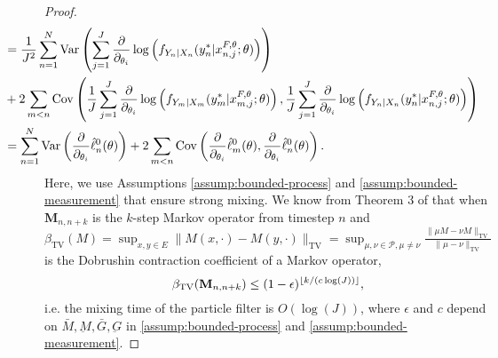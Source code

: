 \begin{proof}
\begin{align}
    & \hspace{-15mm}= \frac{1}{J^2}\sum_{n=1}^N\Var\left(\sum_{j=1}^{J}\frac{\partial}{\partial_{\theta_i}} \log\left(f_{Y_n|X_{n}}(y_n^*|x_{n,j}^{F, \theta}; \theta)\right)\right) \\
    &\hspace{-15mm}+ 2\sum_{m<n}\Cov\left(\frac{1}{J}\sum_{j=1}^{J}\frac{\partial}{\partial_{\theta_i}} \log\left(f_{Y_m|X_{m}}(y_m^*|x_{m,j}^{F, \theta}; \theta)\right), \frac{1}{J}\sum_{j=1}^{J}\frac{\partial}{\partial_{\theta_i}} \log\left(f_{Y_n|X_{n}}(y_n^*|x_{n,j}^{F, \theta}; \theta)\right)\right) \\
    &\hspace{-15mm}= \sum_{n=1}^N \Var\left(\frac{\partial}{\partial_{\theta_i}}\hat\ell_n^0(\theta)\right) + 2\sum_{m<n} \Cov\left(\frac{\partial}{\partial_{\theta_i}}\hat\ell_m^0(\theta),\frac{\partial}{\partial_{\theta_i}}\hat\ell_n^0(\theta)\right).
\end{align}
Here, we use Assumptions \ref{assump:bounded-process} and \ref{assump:bounded-measurement} that ensure strong mixing. We know from Theorem 3 of \cite{karjalainen23} that when $\textbf{M}_{n,n+k}$ is the $k$-step Markov operator from timestep $n$ and $\beta_{\text{TV}}(M) = \sup _{x, y \in E}\|M(x, \cdot)-M(y, \cdot)\|_{\mathrm{TV}}=\sup _{\mu, \nu \in \mathcal{P}, \mu \neq \nu} \frac{\|\mu M-\nu M\|_{\mathrm{TV}}}{\|\mu-\nu\|_{\mathrm{TV}}}$ is the Dobrushin contraction coefficient of a Markov operator, 
\begin{equation}
\beta_{\text{TV}}(\textbf{M}_{n,n+k}) \leq (1-\epsilon)^{\lfloor k/(c\log(J)) \rfloor},
\end{equation}
i.e. the mixing time of the particle filter is $O(\log(J))$, where $\epsilon$ and $c$ depend on $\bar{M}, \underbar{M}, \bar{G}, \underbar{G}$ in \ref{assump:bounded-process} and \ref{assump:bounded-measurement}. 



\end{proof}
